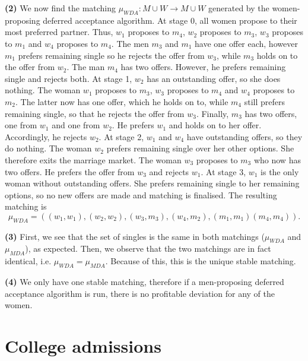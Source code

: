 \documentclass[a4paper]{article}
\begin{document}
	\textbf{(2)} We now find the matching $\mu_{WDA}:M\cup W\rightarrow M\cup W$
	generated by the women-proposing deferred acceptance algorithm. At
	stage 0, all women propose to their most preferred partner. Thus,
	$w_{1}$ proposes to $m_{4}$, $w_{2}$ proposes to $m_{3}$, $w_{3}$
	proposes to $m_{1}$ and $w_{4}$ proposes to $m_{4}$. The men $m_{3}$
	and $m_{1}$ have one offer each, however $m_{1}$ prefers remaining
	single so he rejects the offer from $w_{3}$, while $m_{3}$ holds
	on to the offer from $w_{2}$. The man $m_{4}$ has two offers. However,
	he prefers remaining single and rejects both. At stage 1, $w_{2}$
	has an outstanding offer, so she does nothing. The woman $w_{1}$
	proposes to $m_{3}$, $w_{3}$ proposes to $m_{4}$ and $w_{4}$ proposes
	to $m_{2}$. The latter now has one offer, which he holds on to, while
	$m_{4}$ still prefers remaining single, so that he rejects the offer
	from $w_{3}$. Finally, $m_{3}$ has two offers, one from $w_{1}$
	and one from $w_{2}$. He prefers $w_{1}$ and holds on to her offer.
	Accordingly, he rejects $w_{2}$. At stage 2, $w_{1}$ and $w_{4}$
	have outstanding offers, so they do nothing. The woman $w_{2}$ prefers
	remaining single over her other options. She therefore exits the marriage
	market. The woman $w_{3}$ proposes to $m_{3}$ who now has two offers.
	He prefers the offer from $w_{3}$ and rejects $w_{1}$. At stage
	3, $w_{1}$ is the only woman without outstanding offers. She prefers
	remaining single to her remaining options, so no new offers are made
	and matching is finalised. The resulting matching is 
	\[
	\mu_{WDA}=\left(\left(w_{1},w_{1}\right),\left(w_{2},w_{2}\right),\left(w_{3},m_{3}\right),\left(w_{4},m_{2}\right),\left(m_{1},m_{1}\right)\left(m_{4},m_{4}\right)\right).
	\]
	
	\textbf{(3)} First, we see that the set of singles is the same in both matchings ($\mu_{WDA}$ and $\mu_{MDA}$), as expected. Then, we observe that the two matchings are in fact identical, i.e. $\mu_{WDA}=\mu_{MDA}$. Because of this, this is the unique stable matching.
	
	\textbf{(4)} We only have one stable matching, therefore if
	a men-proposing deferred acceptance algorithm is run, there is no
	profitable deviation for any of the women. 
\fi



\section{College admissions}
	
\end{document}

